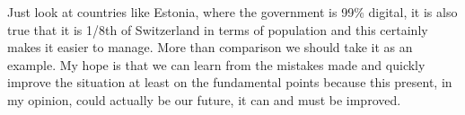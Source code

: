 Just look at countries like Estonia, where the government is 99\% digital, it is also true that it is 1/8th of Switzerland in terms of population and this certainly makes it easier to manage. More than comparison we should take it as an example.
My hope is that we can learn from the mistakes made and quickly improve the situation at least on the fundamental points because this present, in my opinion, could actually be our future, it can and must be improved.
